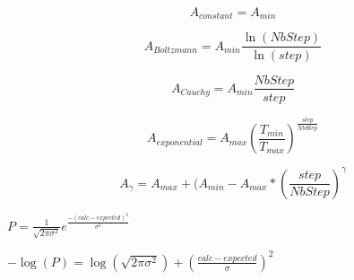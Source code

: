 \documentclass{article}
\begin{document}
\[ A_{constant} = A_{min}\]
\pagebreak

\[ A_{Boltzmann} = A_{min} \frac{\ln(NbStep)}{\ln(step)} \]
\pagebreak

\[ A_{Cauchy} = A_{min} \frac{NbStep}{step} \]
\pagebreak

\[ A_{exponential} = A_{max} (\frac{T_{min}}{T_{max}})^{\frac{step}{NbStep}} \]
\pagebreak

\[ A_{\gamma} = A_{max} +(A_{min}-A_{max}*(\frac{step}{NbStep})^{\gamma} \]
\pagebreak

$ P=\frac{1}{\sqrt{2\pi\sigma^2}}e^{\frac{-(calc-expected)^2}{\sigma^2}}$
\pagebreak

$ -\log(P)= \log\left(\sqrt{2\pi\sigma^2}\right) + \left(\frac{calc-expected}{\sigma} \right)^2$
\pagebreak
\end{document}
